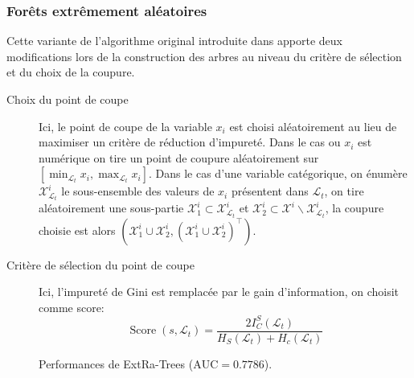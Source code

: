 \subsubsection{Forêts extrêmement aléatoires}

Cette variante de l'algorithme original introduite dans \citet{Geurts2006} apporte deux modifications lors de la construction des arbres au niveau du critère de sélection et du choix de la coupure.

\begin{description}
    \item[Choix du point de coupe] Ici, le point de coupe de la variable $x_i$ est choisi aléatoirement au lieu de maximiser un critère de réduction d'impureté. Dans le cas ou $x_i$ est numérique on tire un point de coupure aléatoirement sur $ \left[ \min_{\mathcal{L}_t} x_i , \max_{\mathcal{L}_t} x_i \right] $. Dans le cas d'une variable catégorique, on énumère $\mathcal{X}^i_{\mathcal{L}_t}$ le sous-ensemble des valeurs de $x_i$ présentent dans $\mathcal{L}_t$, on tire aléatoirement une sous-partie $\mathcal{X}^i_1 \subset \mathcal{X}^i_{\mathcal{L}_t}$ et $\mathcal{X}^i_2 \subset \mathcal{X}^i \smallsetminus \mathcal{X}^i_{\mathcal{L}_t}$, la coupure choisie est alors $\left( \mathcal{X}^i_1 \cup \mathcal{X}^i_2 , \left(\mathcal{X}^i_1 \cup \mathcal{X}^i_2 \right)^\intercal \right)$.
    \item[Critère de sélection du point de coupe] Ici, l'impureté de Gini est remplacée par le gain d'information, on choisit comme score:
    \begin{equation*}
        \operatorname{Score} (s,\mathcal{L}_t) = \frac{2 I^S_C (\mathcal{L}_t) }{H_S (\mathcal{L}_t) + H_c (\mathcal{L}_t) }
    \end{equation*}
\end{description}

\begin{figure}[htbp]
    \caption{Performances de ExtRa-Trees ($\mathrm{AUC} = 0.7786$).}
\end{figure}

